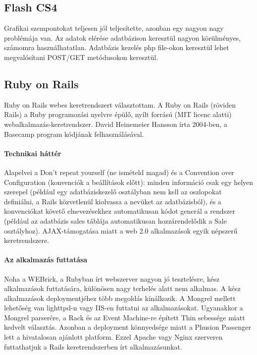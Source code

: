 	\subsection{Flash CS4} %
	\label{sub:flash_cs4}
	
	Grafikai szempontokat teljesen jól teljesítette, azonban egy nagyon nagy problémája van. Az adatok elérése adatbázison
	keresztül nagyon körülményes, számomra használhatatlan. Adatbázis kezelés php file-okon keresztül lehet megvalósítani POST/GET
	metódusokon keresztül.

\label{sec:webes_keretrendszer}

\subsection{Ruby on Rails} %
\label{sub:ruby_on_rails}
Ruby on Rails webes keretrendszert választottam. A Ruby on Rails (röviden Rails) a Ruby programozási nyelvre épülő, nyílt forrású (MIT licenc alatti) webalkalmazás-keretrendszer. David Heinemeier Hansson írta 2004-ben, a Basecamp program kódjának felhasználásával.

\paragraph{Technikai háttér}
Alapelvei a Don't repeat yourself (ne ismételd magad) és a Convention over Configuration (konvenciók a beállítások előtt): minden információ csak egy helyen szerepel (például egy adatbáziskezelő osztályban nem kell az oszlopokat definiálni, a Rails közvetlenül kiolvassa a nevüket az adatbázisból), és a konvenciókat követő elnevezésekhez automatikusan kódot generál a rendszer (például az adatbázis sales táblája automatikusan hozzárendelődik a Sale osztályhoz). AJAX-támogatása miatt a web 2.0 alkalmazások egyik népszerű keretrendszere.

\paragraph{Az alkalmazás futtatása}
Noha a WEBrick, a Rubyban írt webszerver nagyon jó tesztelésre, kész alkalmazások futtatására, különösen nagy terhelés alatt nem alkalmas. A kész alkalmazások deploymentjéhez több megoldás kínálkozik. A Mongrel mellett lehetőség van lighttpd-n vagy IIS-en futtatni az alkalmazásokat. Ugyanakkor a Mongrel parserére, a Rack és az Event Machine-re épített Thin sebessége miatt kedvelt választás. Azonban a deployment könnyedsége miatt a Phusion Passenger lett a hivatalosan ajánlott platform. Ezzel Apache vagy Nginx szerveren futtathatjuk a Rails keretrendszerben írt alkalmazásunkat.

